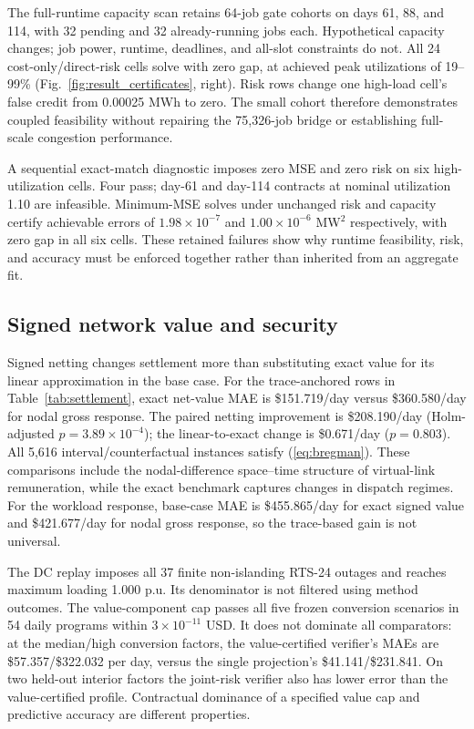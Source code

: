 \documentclass[10pt,journal]{IEEEtran}
\begin{document}
The full-runtime capacity scan retains 64-job gate cohorts on days 61, 88,
and 114, with 32 pending and 32 already-running jobs each. Hypothetical
capacity changes; job power, runtime, deadlines, and all-slot constraints do
not. All 24 cost-only/direct-risk cells solve with zero gap, at achieved
peak utilizations of 19--99\% (Fig.~\ref{fig:result_certificates}, right). Risk rows change one high-load cell's false
credit from 0.00025 MWh to zero. The small cohort therefore demonstrates
coupled feasibility without repairing the 75,326-job bridge or establishing
full-scale congestion performance.

A sequential exact-match diagnostic imposes zero MSE and zero risk on six
high-utilization cells. Four pass; day-61 and day-114 contracts at nominal
utilization 1.10 are infeasible. Minimum-MSE solves under unchanged risk and
capacity certify achievable errors of $1.98\times10^{-7}$ and
$1.00\times10^{-6}$ MW$^2$ respectively, with zero gap in all six cells.
These retained failures show why runtime feasibility, risk, and accuracy
must be enforced together rather than inherited from an aggregate fit.


\subsection{Signed network value and security}

Signed netting changes settlement more than substituting exact value for its
linear approximation in the base case. For the trace-anchored rows in
Table~\ref{tab:settlement}, exact net-value MAE is \$151.719/day versus
\$360.580/day for nodal gross response. The paired netting improvement is
\$208.190/day (Holm-adjusted $p=3.89\times10^{-4}$); the linear-to-exact
change is \$0.671/day ($p=0.803$). All 5,616 interval/counterfactual instances
satisfy (\ref{eq:bregman}). These comparisons include the nodal-difference
space--time structure of virtual-link remuneration, while the exact benchmark
captures changes in dispatch regimes. For the workload response, base-case
MAE is \$455.865/day for exact signed value and \$421.677/day for nodal gross
response, so the trace-based gain is not universal.



The DC replay imposes all 37 finite non-islanding RTS-24 outages and reaches
maximum loading 1.000 p.u. Its denominator is not filtered using method
outcomes. The value-component cap passes all five frozen conversion scenarios
in 54 daily programs within $3\times10^{-11}$ USD. It does not dominate all
comparators: at the median/high conversion factors, the value-certified
verifier's MAEs are \$57.357/\$322.032 per day, versus the single projection's
\$41.141/\$231.841. On two held-out interior factors the joint-risk verifier
also has lower error than the value-certified profile. Contractual dominance
of a specified value cap and predictive accuracy are different properties.
\end{document}
